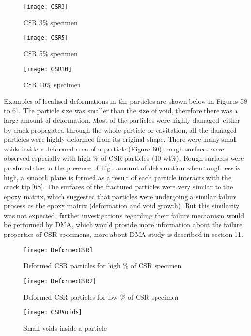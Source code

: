 \documentclass[numbers=noendperiod,chapterprefix=on]{icldt} %
\begin{document}
\begin{figure}[!htpb]
\centering
\texttt{[image: CSR3]}
\caption{CSR 3\% specimen}
\end{figure}
\FloatBarrier

\begin{figure}[!htpb]
\centering
\texttt{[image: CSR5]}
\caption{CSR 5\% specimen}
\end{figure}
\FloatBarrier

\begin{figure}[!htpb]
\centering
\texttt{[image: CSR10]}
\caption{CSR 10\% specimen}
\end{figure}
\FloatBarrier

Examples of localised deformations in the particles are shown below in Figures 58 to 61. The particle size was smaller than the size of void, therefore there was a large amount of deformation. Most of the particles were highly damaged, either by crack propagated through the whole particle or cavitation, all the damaged particles were highly deformed from its original shape. There were many small voids inside a deformed area of a particle (Figure 60), rough surfaces were observed especially with high \% of CSR particles (10 wt\%). Rough surfaces were produced due to the presence of high amount of deformation when toughness is high, a smooth plane is formed as a result of each particle interacts with the crack tip [68]. The surfaces of the fractured particles were very similar to the epoxy matrix, which suggested that particles were undergoing a similar failure process as the epoxy matrix (deformation and void growth). But this similarity was not expected, further investigations regarding their failure mechanism would be performed by DMA, which would provide more information about the failure properties of CSR specimens, more about DMA study is described in section 11.

\begin{figure}[!htpb]
\centering
\texttt{[image: DeformedCSR]}
\caption{Deformed CSR particles for high \% of CSR specimen }
\end{figure}
\FloatBarrier

\begin{figure}[!htpb]
\centering
\texttt{[image: DeformedCSR2]}
\caption{Deformed CSR particles for low \% of CSR specimen }
\end{figure}
\FloatBarrier

\begin{figure}[!htpb]
\centering
\texttt{[image: CSRVoids]}
\caption{Small voids inside a particle}
\end{figure}
\FloatBarrier
\end{document}
